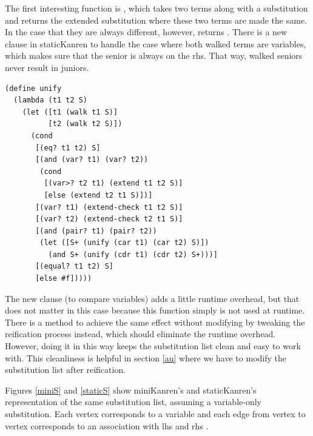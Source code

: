The first interesting function is , which takes two terms along with a substitution and returns the extended substitution where these two terms are made the same. In the case that they are always different, however,  returns . There is a new clause in staticKanren to handle the case where both walked terms are variables, which makes sure that the senior is always on the rhs. That way, walked seniors never result in juniors.
\begin{lstlisting}
(define unify
  (lambda (t1 t2 S)
    (let ([t1 (walk t1 S)]
          [t2 (walk t2 S)])
      (cond
       [(eq? t1 t2) S]
       [(and (var? t1) (var? t2))
        (cond
         [(var>? t2 t1) (extend t1 t2 S)]
         [else (extend t2 t1 S)])]
       [(var? t1) (extend-check t1 t2 S)]
       [(var? t2) (extend-check t2 t1 S)]
       [(and (pair? t1) (pair? t2))
        (let ([S+ (unify (car t1) (car t2) S)])
          (and S+ (unify (cdr t1) (cdr t2) S+)))]
       [(equal? t1 t2) S]
       [else #f]))))
\end{lstlisting}

The new clause (to compare variables) adds a little runtime overhead, but that does not matter in this case because this function simply is not used at runtime. There is a method to achieve the same effect without modifying  by tweaking the reification process instead, which should eliminate the runtime overhead. However, doing it in this way keeps the substitution list clean and easy to work with. This cleanliness is helpful in section \ref{au} where we have to modify the substitution list after reification.

Figures \ref{miniS} and \ref{staticS} show miniKanren's and staticKanren's representation of the same substitution list, assuming a variable-only substitution. Each vertex corresponds to a variable and each edge from vertex  to vertex  corresponds to an association with lhs  and rhs .

